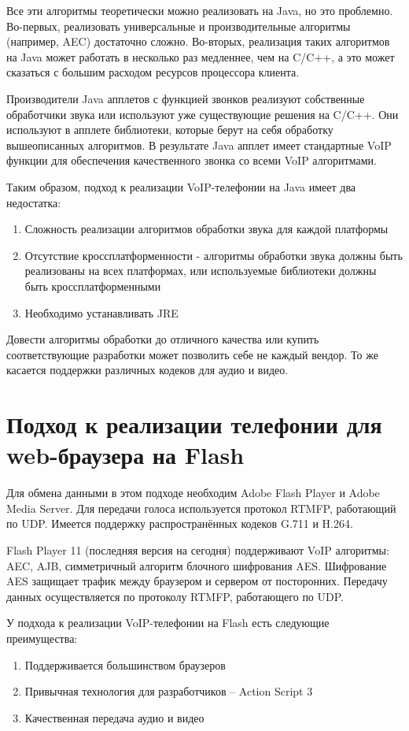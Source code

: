 Все эти алгоритмы теоретически можно реализовать на Java, но это проблемно. Во-первых, реализовать универсальные и производительные алгоритмы (например, AEC) достаточно сложно. Во-вторых, реализация таких алгоритмов на Java может работать в несколько раз медленнее, чем на C/C++, а это может сказаться с большим расходом ресурсов процессора клиента.

Производители Java апплетов с функцией звонков реализуют собственные обработчики звука или используют уже существующие решения на C/C++. Они используют в апплете библиотеки, которые берут на себя обработку вышеописанных алгоритмов. В результате Java апплет имеет стандартные VoIP функции для обеспечения качественного звонка со всеми VoIP алгоритмами.

Таким образом, подход к реализации VoIP-телефонии на Java имеет два недостатка:
\begin{enumerate}
\item Сложность реализации алгоритмов обработки звука для каждой платформы
\item Отсутствие кроссплатформенности - алгоритмы обработки звука должны быть реализованы на всех платформах, или используемые библиотеки должны быть кроссплатформенными
\item Необходимо устанавливать JRE
\end{enumerate}

Довести алгоритмы обработки до отличного качества или купить соответствующие разработки может позволить себе не каждый вендор. То же касается поддержки различных кодеков для аудио и видео.

\section{Подход к реализации телефонии для web-браузера на Flash}

Для обмена данными в этом подходе необходим Adobe Flash Player и Adobe Media Server. Для передачи голоса используется протокол RTMFP, работающий по UDP. Имеется поддержку распространённых кодеков G.711 и H.264.

Flash Player 11 (последняя версия на сегодня) поддерживают VoIP алгоритмы: AEC, AJB, симметричный алгоритм блочного шифрования AES. Шифрование AES защищает трафик между браузером и сервером от посторонних. Передачу данных осуществляется по протоколу RTMFP, работающего по UDP.\cite{adobe}

У подхода к реализации VoIP-телефонии на Flash есть следующие преимущества:
\begin{enumerate}
\item Поддерживается большинством браузеров
\item Привычная технология для разработчиков – Action Script 3
\item Качественная передача аудио и видео
\end{enumerate}

